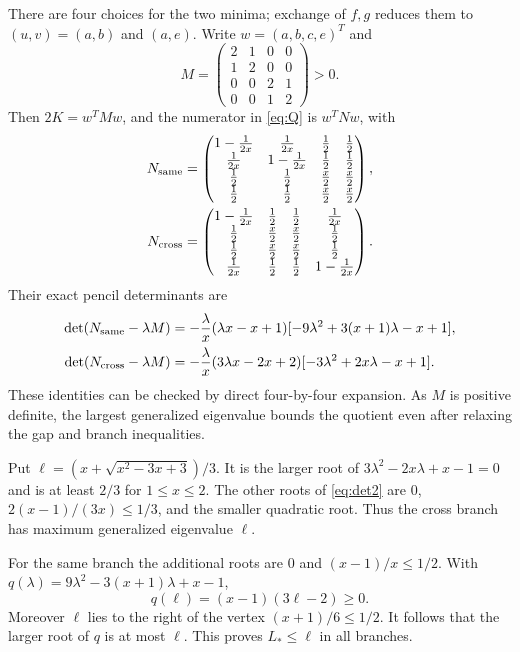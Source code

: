 \documentclass[11pt,a4paper]{article}
\theoremstyle{remark}\newtheorem{remark}[theorem]{Remark}
\begin{document}
There are four choices for the two minima; exchange of $f,g$ reduces
them to $(u,v)=(a,b)$ and $(a,e)$. Write $w=(a,b,c,e)^T$ and
\[
 M=\begin{pmatrix}2&1&0&0\\1&2&0&0\\0&0&2&1\\0&0&1&2\end{pmatrix}>0.
\]
Then $2K=w^TMw$, and the numerator in \eqref{eq:Q} is $w^TNw$, with
\begin{align*}
 N_{\rm same}&=
 \begin{pmatrix}
 1-\frac1{2x}&\frac1{2x}&\frac12&\frac12\\
 \frac1{2x}&1-\frac1{2x}&\frac12&\frac12\\
 \frac12&\frac12&\frac x2&\frac x2\\
 \frac12&\frac12&\frac x2&\frac x2
 \end{pmatrix},\\
 N_{\rm cross}&=
 \begin{pmatrix}
 1-\frac1{2x}&\frac12&\frac12&\frac1{2x}\\
 \frac12&\frac x2&\frac x2&\frac12\\
 \frac12&\frac x2&\frac x2&\frac12\\
 \frac1{2x}&\frac12&\frac12&1-\frac1{2x}
 \end{pmatrix}.
\end{align*}
Their exact pencil determinants are
\begin{align}
 \det(N_{\rm same}-\lambda M)
 &=-\frac{\lambda}{x}(\lambda x-x+1)
       [-9\lambda^2+3(x+1)\lambda-x+1],\label{eq:det1}\\
 \det(N_{\rm cross}-\lambda M)
 &=-\frac{\lambda}{x}(3\lambda x-2x+2)
       [-3\lambda^2+2x\lambda-x+1].\label{eq:det2}
\end{align}
These identities can be checked by direct four-by-four expansion.
As $M$ is positive definite, the largest generalized eigenvalue bounds
the quotient even after relaxing the gap and branch inequalities.

Put $\ell=(x+\sqrt{x^2-3x+3})/3$. It is the larger root of
$3\lambda^2-2x\lambda+x-1=0$ and is at least $2/3$ for $1\le x\le2$.
The other roots of \eqref{eq:det2} are $0$,
$2(x-1)/(3x)\le1/3$, and the smaller quadratic root. Thus the cross
branch has maximum generalized eigenvalue $\ell$.

For the same branch the additional roots are $0$ and $(x-1)/x\le1/2$.
With $q(\lambda)=9\lambda^2-3(x+1)\lambda+x-1$,
\[
 q(\ell)=(x-1)(3\ell-2)\ge0.
\]
Moreover $\ell$ lies to the right of the vertex $(x+1)/6\le1/2$.
It follows that the larger root of $q$ is at most $\ell$. This proves
$L_*\le\ell$ in all branches.
\end{document}
